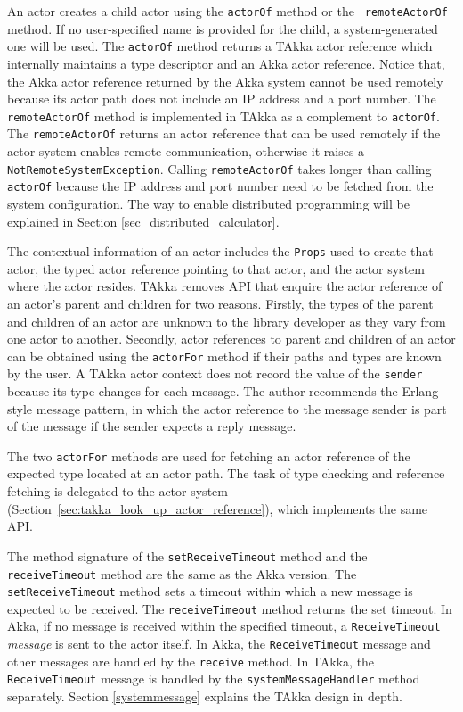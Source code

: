 An actor creates a child actor using the {\tt actorOf} method or the {\tt 
remoteActorOf} method.  If no user-specified name is provided for the child, a 
system-generated one will be used.  The {\tt actorOf} method returns a TAkka 
actor reference which internally maintains a type descriptor and an Akka actor 
reference.  Notice that, the Akka actor reference returned by the Akka system 
cannot be used remotely because its actor path does not include an IP address 
and a port number.  The {\tt remoteActorOf} method is implemented in TAkka as a 
complement to {\tt actorOf}.  The {\tt remoteActorOf} returns an actor 
reference that can be used remotely if the actor system enables remote 
communication, otherwise it raises a {\tt NotRemoteSystemException}.  Calling 
{\tt remoteActorOf} takes longer than calling {\tt actorOf} because the IP 
address and port number need to be fetched from the system configuration.
The way to enable distributed programming will be explained in Section 
\ref{sec_distributed_calculator}.


The contextual information of an actor includes the {\tt Props} used to create 
that actor, the typed actor reference pointing to that actor, and the actor 
system where the actor resides.  TAkka removes API that enquire the 
actor reference of an actor's parent and children for two reasons.  Firstly, 
the types of the parent and children of an actor are unknown to the library 
developer as they vary from one actor to another.  Secondly, actor references 
to parent and children of an actor can be obtained using the {\tt actorFor} 
method if their paths and types are known by the user.  A TAkka actor context 
does not record the value of the {\tt sender} because its type changes for each 
message.  The author recommends the Erlang-style message pattern, in which the 
actor reference to the message sender is part of the message if the sender 
expects a reply message.

The two {\tt actorFor} methods are used for fetching an actor reference of the 
expected type located at an actor path.  The task of type checking and 
reference fetching is
delegated to the actor system (Section~\ref{sec:takka_look_up_actor_reference}),
which implements the same API.

The method signature of the {\tt setReceiveTimeout} method and the \\
{\tt receiveTimeout} method are the same as the Akka version.  The
{\tt setReceiveTimeout} method sets a timeout within which a 
new message is expected to be received.  The {\tt receiveTimeout} method returns
the set timeout.  In Akka, if no message is received within the specified 
timeout, a {\tt ReceiveTimeout} {\it message} is sent to the actor itself.  
In Akka, the {\tt ReceiveTimeout} message and other messages are handled by the 
{\tt receive} method.  In TAkka, the {\tt ReceiveTimeout} message is 
handled by the {\tt systemMessageHandler} method separately.  Section 
\ref{systemmessage} explains the TAkka design in depth.

